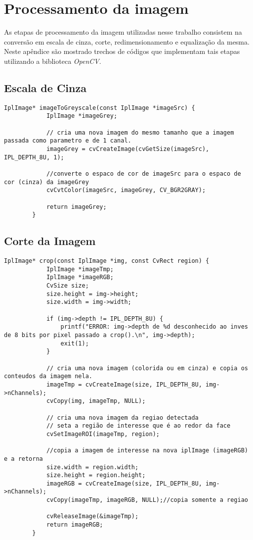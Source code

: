 \chapter{Processamento da imagem}
\label{apend:processamento}

As etapas de processamento da imagem utilizadas nesse trabalho consistem na conversão em escala de cinza, corte, redimensionamento e equalização da mesma. Neste apêndice são mostrado trechos de códigos que implementam tais etapas utilizando a biblioteca \textit{OpenCV}.

\section{Escala de Cinza}

		\begin{lstlisting}[caption=Conversão de uma imagem para escala de cinza., label=list:grey-scale]
		IplImage* imageToGreyscale(const IplImage *imageSrc) {
			IplImage *imageGrey;

			// cria uma nova imagem do mesmo tamanho que a imagem passada como parametro e de 1 canal.
			imageGrey = cvCreateImage(cvGetSize(imageSrc), IPL_DEPTH_8U, 1);

			//converte o espaco de cor de imageSrc para o espaco de cor (cinza) da imageGrey
			cvCvtColor(imageSrc, imageGrey, CV_BGR2GRAY);

			return imageGrey;
		}
		\end{lstlisting}

\section{Corte da Imagem}

	\begin{lstlisting}[caption=Corte de uma imagem., label=list:crop]
		IplImage* crop(const IplImage *img, const CvRect region) {
			IplImage *imageTmp;
			IplImage *imageRGB;
			CvSize size;
			size.height = img->height;
			size.width = img->width;

			if (img->depth != IPL_DEPTH_8U) {
				printf("ERROR: img->depth de %d desconhecido ao inves de 8 bits por pixel passado a crop().\n", img->depth);
				exit(1);
			}

			// cria uma nova imagem (colorida ou em cinza) e copia os conteudos da imagem nela.
			imageTmp = cvCreateImage(size, IPL_DEPTH_8U, img->nChannels);
			cvCopy(img, imageTmp, NULL);

			// cria uma nova imagem da regiao detectada
			// seta a região de interesse que é ao redor da face
			cvSetImageROI(imageTmp, region);

			//copia a imagem de interesse na nova iplImage (imageRGB) e a retorna
			size.width = region.width;
			size.height = region.height;
			imageRGB = cvCreateImage(size, IPL_DEPTH_8U, img->nChannels);
			cvCopy(imageTmp, imageRGB, NULL);//copia somente a regiao

			cvReleaseImage(&imageTmp);
			return imageRGB;
		}
	\end{lstlisting}


